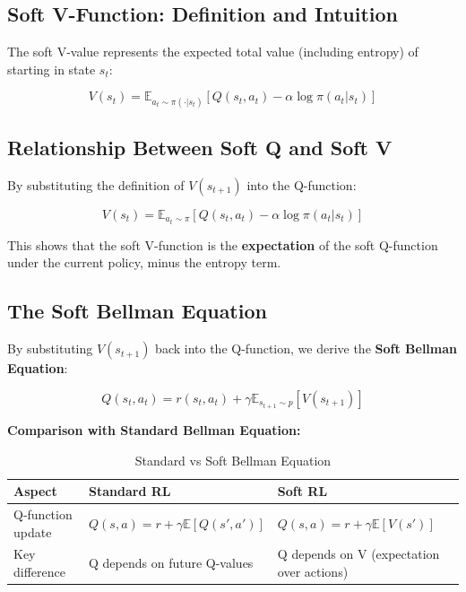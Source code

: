 \documentclass[12pt,a4paper]{article}
\theoremstyle{noteplain}
\theoremstyle{noteexercise}
\begin{document}
\subsection{Soft V-Function: Definition and Intuition}\label{ssec:soft-v}



The soft V-value represents the expected total value (including entropy) of starting in state $s_t$:

\begin{equation}\label{eq:soft-v}
\boxed{V(s_t) = \mathbb{E}_{a_t \sim \pi(\cdot|s_t)}[Q(s_t, a_t) - \alpha \log\pi(a_t|s_t)]}
\end{equation}



\subsection{Relationship Between Soft Q and Soft V}\label{ssec:q-v-relation}



By substituting the definition of $V(s_{t+1})$ into the Q-function:

$$V(s_t) = \mathbb{E}_{a_t \sim \pi}[Q(s_t, a_t) - \alpha \log\pi(a_t|s_t)]$$

This shows that the soft V-function is the \textbf{expectation} of the soft Q-function under the current policy, minus the entropy term.



\subsection{The Soft Bellman Equation}\label{ssec:soft-bellman}



By substituting $V(s_{t+1})$ back into the Q-function, we derive the \textbf{Soft Bellman Equation}:

\begin{equation}\label{eq:soft-bellman}
\boxed{Q(s_t, a_t) = r(s_t, a_t) + \gamma \mathbb{E}_{s_{t+1} \sim p}[V(s_{t+1})]}
\end{equation}

\textbf{Comparison with Standard Bellman Equation:}

\begin{table}[H]
  \centering
  \caption{Standard vs Soft Bellman Equation}
  \label{tab:bellman-comp}
  \begin{tabular}{m{4cm}m{5cm}m{5cm}}
    \toprule
    \textbf{Aspect} & \textbf{Standard RL} & \textbf{Soft RL} \\
    \midrule
    Q-function update & $Q(s,a) = r + \gamma \mathbb{E}[Q(s',a')]$ & $Q(s,a) = r + \gamma \mathbb{E}[V(s')]$ \\
    \midrule
    Key difference & Q depends on future Q-values & Q depends on V (expectation over actions) \\
    \bottomrule
  \end{tabular}
\end{table}
\end{document}
